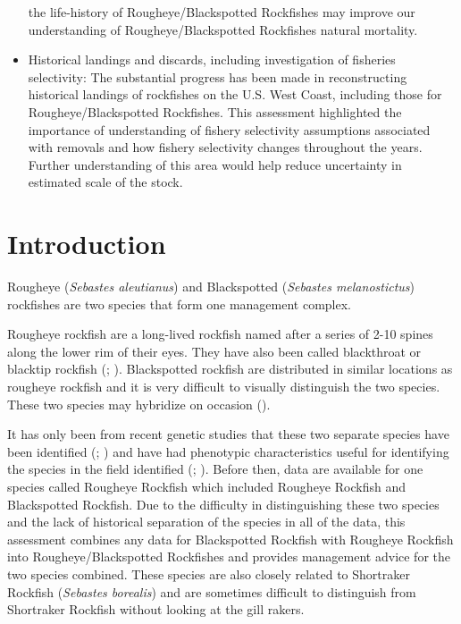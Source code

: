 \documentclass[
]{scrartcl}
\begin{document}
\begin{itemize}
  the life-history of Rougheye/Blackspotted Rockfishes may improve our
  understanding of Rougheye/Blackspotted Rockfishes natural mortality.
\item
  Historical landings and discards, including investigation of fisheries
  selectivity: The substantial progress has been made in reconstructing
  historical landings of rockfishes on the U.S. West Coast, including
  those for Rougheye/Blackspotted Rockfishes. This assessment
  highlighted the importance of understanding of fishery selectivity
  assumptions associated with removals and how fishery selectivity
  changes throughout the years. Further understanding of this area would
  help reduce uncertainty in estimated scale of the stock.
\end{itemize}

\newpage{}

\setlength{\parskip}{5mm plus1mm minus1mm}
\setcounter{page}{1}
\setcounter{section}{0}
\renewcommand{\thefigure}{\arabic{figure}}
\setcounter{figure}{0}
\renewcommand{\thetable}{\arabic{table}}
\setcounter{table}{0}

\section{Introduction}\label{introduction}

Rougheye (\emph{Sebastes aleutianus}) and Blackspotted (\emph{Sebastes
melanostictus}) rockfishes are two species that form one management
complex.

Rougheye rockfish are a long-lived rockfish named after a series of 2-10
spines along the lower rim of their eyes. They have also been called
blackthroat or blacktip rockfish
(; ). Blackspotted
rockfish are distributed in similar locations as rougheye rockfish and
it is very difficult to visually distinguish the two species. These two
species may hybridize on occasion
().

It has only been from recent genetic studies that these two separate
species have been identified
(;
) and have
had phenotypic characteristics useful for identifying the species in the
field identified (; ). Before then, data are available for one species called Rougheye
Rockfish which included Rougheye Rockfish and Blackspotted Rockfish. Due
to the difficulty in distinguishing these two species and the lack of
historical separation of the species in all of the data, this assessment
combines any data for Blackspotted Rockfish with Rougheye Rockfish into
Rougheye/Blackspotted Rockfishes and provides management advice for the
two species combined. These species are also closely related to
Shortraker Rockfish (\emph{Sebastes borealis}) and are sometimes
difficult to distinguish from Shortraker Rockfish without looking at the
gill rakers.
\end{document}
